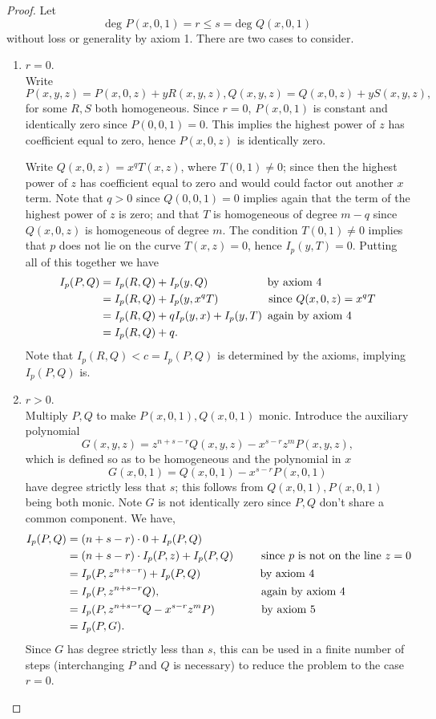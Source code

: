 \documentclass{article}
\theoremstyle{remark}
\begin{document}
\begin{proof}
Let 
\[\text{deg }P(x,0,1)=r\leq s=\text{deg }Q(x,0,1)\]
without loss or generality by axiom 1. There are two cases to consider.
\begin{enumerate}
\item $r=0$. \\
Write
\[P(x,y,z)=P(x,0,z)+yR(x,y,z), Q(x,y,z)=Q(x,0,z)+yS(x,y,z), \]
for some $R,S$ both homogeneous. Since $r=0$, $P(x,0,1)$ is constant and identically zero since $P(0,0,1)=0$. This implies the highest power of $z$ has coefficient equal to zero, hence $P(x,0,z)$ is identically zero.\\ \par
Write $Q(x,0,z)=x^qT(x,z)$, where $T(0,1)\neq 0$; since then the highest power of $z$ has coefficient equal to zero and would could factor out another $x$ term. Note that $q>0$ since $Q(0,0,1)=0$ implies again that the term of the highest power of $z$ is zero; and that $T$ is homogeneous of degree $m-q$ since $Q(x,0,z)$ is homogeneous of degree $m$. The condition $T(0,1)\neq 0$ implies that $p$ does not lie on the curve $T(x,z)=0$, hence $I_p(y,T)=0$. Putting all of this together we have
\begin{align*}
  I_p(P,Q)&=I_p(R,Q) + I_p(y,Q) \text{ \,\,\,\,\,\,\,\,\,\,\,\,\,\,\,\,\,\,\,\,\,\,\,\,\,\,\,\, by axiom 4}\\
  &=I_p(R,Q)+I_p(y,x^qT) \text{ \,\,\,\,\,\,\,\,\,\,\,\,\,\,\,\,\,\,\,\,\,\,\, since }Q(x,0,z)=x^qT \\
  &=I_p(R,Q)+qI_p(y,x)+I_p(y,T) \text{ \,again by axiom 4}\\
  &=I_p(R,Q)+q.
\end{align*}
Note that $I_p(R,Q)<c=I_p(P,Q)$ is determined by the axioms, implying $I_p(P,Q)$ is. 
\item $r>0$. \\
Multiply $P,Q$ to make $P(x,0,1),Q(x,0,1)$ monic. Introduce the auxiliary polynomial 
\[G(x,y,z)=z^{n+s-r}Q(x,y,z)-x^{s-r}z^mP(x,y,z), \]
which is defined so as to be homogeneous and the polynomial in $x$
\[G(x,0,1)=Q(x,0,1)-x^{s-r}P(x,0,1)\]
have degree strictly less that $s$; this follows from $Q(x,0,1),P(x,0,1)$ being both monic. Note $G$ is not identically zero since $P,Q$ don't share a common component. We have,
\begin{align*}
  I_p (P,Q) &= (n+s-r)\cdot 0 +I_p(P,Q) \\
  &= (n+s-r)\cdot I_p (P,z)+ I_p(P,Q) \text{ \,\,\,\,\,\,\,\,\,\,\,\,\,since }p\text{ is not on the line }z=0\\
  &=I_p(P,z^{n+s-r})+I_p(P,Q) \text{\, \,\,\,\,\,\,\,\,\,\,\,\,\,\,\,\,\,\,\,\,\,\,\,\,\,\,\, by axiom 4}\\
  &=I_p(P,z^{n+s-r}Q), \text{ \,\,\,\,\,\,\,\,\,\,\,\,\,\,\,\,\,\,\,\,\,\,\,\,\,\,\,\,\,\,\,\,\,\,\,\,\,\,\,\,\,\,\,\,\,\,\,\,\,\, again by axiom 4}\\
  &=I_p(P,z^{n+s-r}Q-x^{s-r}z^mP) \text{\, \,\,\,\,\,\,\,\,\,\,\,\,\,\,\,\,\,\,\,\, by axiom 5}\\
  &=I_p(P,G).
\end{align*}
Since $G$ has degree strictly less than $s$, this can be used in a finite number of steps (interchanging $P$ and $Q$ is necessary) to reduce the problem to the case $r=0$.
\end{enumerate}
\end{proof}
\end{document}
